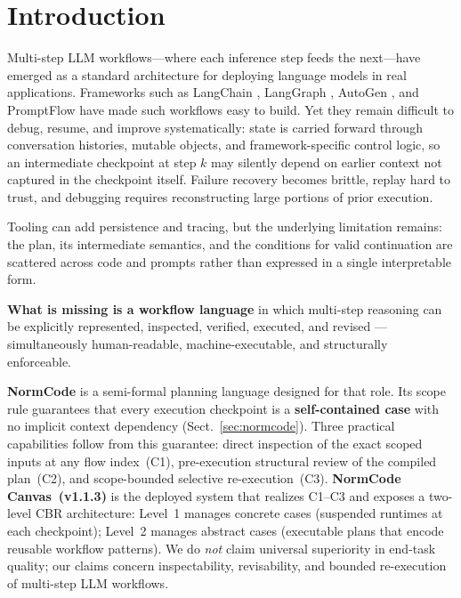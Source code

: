 \section{Introduction}
\label{sec:intro}

Multi-step LLM workflows---where each inference step feeds the next---have emerged as a
standard architecture for deploying language models in real applications. Frameworks such
as LangChain \cite{chase2022}, LangGraph \cite{langgraph2024}, AutoGen \cite{wu2023},
and PromptFlow \cite{microsoft2023} have made such workflows easy to build. Yet they
remain difficult to debug, resume, and improve systematically: state is carried forward
through conversation histories, mutable objects, and framework-specific control logic,
so an intermediate checkpoint at step $k$ may silently depend on earlier context not
captured in the checkpoint itself. Failure recovery becomes brittle, replay hard to
trust, and debugging requires reconstructing large portions of prior execution.

Tooling can add persistence and tracing, but the underlying limitation remains: the
plan, its intermediate semantics, and the conditions for valid continuation are scattered
across code and prompts rather than expressed in a single interpretable form.

\textbf{What is missing is a workflow language} in which multi-step reasoning can be
explicitly represented, inspected, verified, executed, and revised --- simultaneously
human-readable, machine-executable, and structurally enforceable.

\textbf{NormCode} \cite{guan2026normcodesemiformallanguageauditable} is a semi-formal planning language designed for that
role. Its scope rule guarantees that every execution checkpoint is a
\textbf{self-contained case} with no implicit context dependency
(Sect.~\ref{sec:normcode}). Three practical capabilities follow from this guarantee:
direct inspection of the exact scoped inputs at any flow index~(C1), pre-execution
structural review of the compiled plan~(C2), and scope-bounded selective
re-execution~(C3). \textbf{NormCode Canvas~(v1.1.3)} is the deployed system that
realizes C1--C3 and exposes a two-level CBR architecture: Level~1 manages concrete
cases (suspended runtimes at each checkpoint); Level~2 manages abstract cases
(executable plans that encode reusable workflow patterns). We do \textit{not} claim
universal superiority in end-task quality; our claims concern inspectability,
revisability, and bounded re-execution of multi-step LLM workflows.

